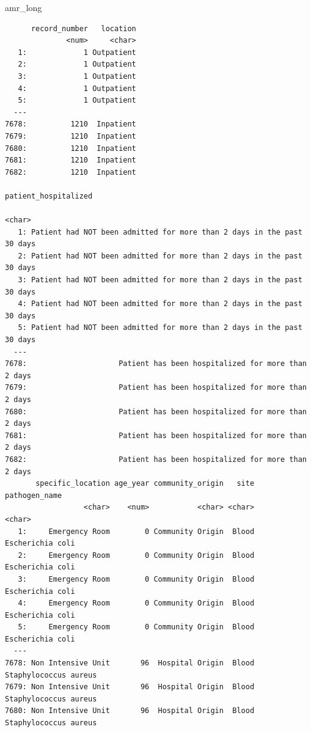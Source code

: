 \documentclass[
  letterpaper,
  DIV=11,
  numbers=noendperiod]{scrreprt}
\newenvironment{Shaded}{\begin{snugshade}}{\end{snugshade}}
\newcommand{\NormalTok}[1]{\textcolor[rgb]{0.00,0.23,0.31}{#1}}
\begin{document}
\begin{Shaded}
\begin{Highlighting}[]
\NormalTok{amr\_long}
\end{Highlighting}
\end{Shaded}

\begin{verbatim}
      record_number   location
              <num>     <char>
   1:             1 Outpatient
   2:             1 Outpatient
   3:             1 Outpatient
   4:             1 Outpatient
   5:             1 Outpatient
  ---                         
7678:          1210  Inpatient
7679:          1210  Inpatient
7680:          1210  Inpatient
7681:          1210  Inpatient
7682:          1210  Inpatient
                                                        patient_hospitalized
                                                                      <char>
   1: Patient had NOT been admitted for more than 2 days in the past 30 days
   2: Patient had NOT been admitted for more than 2 days in the past 30 days
   3: Patient had NOT been admitted for more than 2 days in the past 30 days
   4: Patient had NOT been admitted for more than 2 days in the past 30 days
   5: Patient had NOT been admitted for more than 2 days in the past 30 days
  ---                                                                       
7678:                     Patient has been hospitalized for more than 2 days
7679:                     Patient has been hospitalized for more than 2 days
7680:                     Patient has been hospitalized for more than 2 days
7681:                     Patient has been hospitalized for more than 2 days
7682:                     Patient has been hospitalized for more than 2 days
       specific_location age_year community_origin   site         pathogen_name
                  <char>    <num>           <char> <char>                <char>
   1:     Emergency Room        0 Community Origin  Blood      Escherichia coli
   2:     Emergency Room        0 Community Origin  Blood      Escherichia coli
   3:     Emergency Room        0 Community Origin  Blood      Escherichia coli
   4:     Emergency Room        0 Community Origin  Blood      Escherichia coli
   5:     Emergency Room        0 Community Origin  Blood      Escherichia coli
  ---                                                                          
7678: Non Intensive Unit       96  Hospital Origin  Blood Staphylococcus aureus
7679: Non Intensive Unit       96  Hospital Origin  Blood Staphylococcus aureus
7680: Non Intensive Unit       96  Hospital Origin  Blood Staphylococcus aureus

\end{verbatim}
\end{document}
